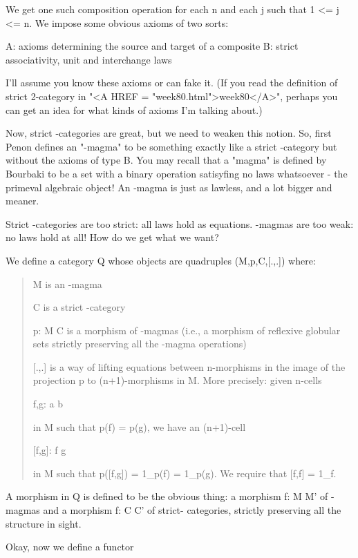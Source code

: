 We get one such composition operation for each n and each j such 
that 1 <= j <= n.   We impose some obvious axioms of two
sorts:

A: axioms determining the source and target of a composite
B: strict associativity, unit and interchange laws

I'll assume you know these axioms or can fake it.  (If you
read the definition of strict 2-category in "<A HREF = "week80.html">week80</A>", perhaps
you can get an idea for what kinds of axioms I'm talking about.)

Now, strict \omega -categories are great, but we need to weaken this
notion.  So, first Penon defines an "\omega -magma" to be something
exactly like a strict \omega -category but without the axioms of type B.
You may recall that a "magma" is defined by Bourbaki to be a set with
a binary operation satisyfing no laws whatsoever - the primeval
algebraic object!  An \omega -magma is just as lawless, and a lot bigger
and meaner.

Strict \omega -categories are too strict: all laws hold as equations.
\Omega -magmas are too weak: no laws hold at all!  How do we get what
we want?  

We define a category Q whose objects are quadruples (M,p,C,[.,.])
where:

\begin{quote}
M is an \omega -magma 

C is a strict \omega -category

p: M \to  C is a morphism of \omega -magmas (i.e., a morphism of
reflexive globular sets strictly preserving all the \omega -magma
operations)

[.,.] is a way of lifting equations between n-morphisms in the 
image of the projection p to (n+1)-morphisms in M.  More precisely: 
given n-cells

f,g: a \to  b

in M such that p(f) = p(g), we have an (n+1)-cell

[f,g]: f \to  g

in M such that p([f,g]) = 1_{p(f)} = 1_{p(g)}.  
We require that [f,f] = 1_{f}.

\end{quote}
A morphism in Q is defined to be the obvious thing: a morphism
f: M \to  M' of \omega -magmas and a morphism f: C \to  C' of strict-\omega 
categories, strictly preserving all the structure in sight.

Okay, now we define a functor

